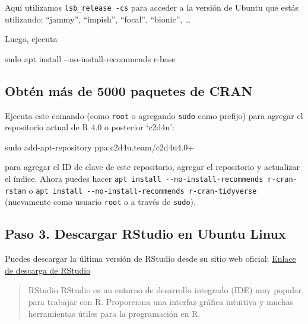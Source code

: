 \documentclass[
  a4paper,
]{article}
\newenvironment{Shaded}{}{}
\newcommand{\AttributeTok}[1]{\textcolor[rgb]{0.84,0.23,0.29}{#1}}
\newcommand{\FunctionTok}[1]{\textcolor[rgb]{0.44,0.26,0.76}{#1}}
\newcommand{\NormalTok}[1]{\textcolor[rgb]{0.14,0.16,0.18}{#1}}
\begin{document}
Aquí utilizamos \texttt{lsb\_release\ -cs} para acceder a la versión de
Ubuntu que estás utilizando: ``jammy'', ``impish'', ``focal'',
``bionic'', \ldots{}

Luego, ejecuta

\begin{Shaded}
\begin{Highlighting}[]
\FunctionTok{sudo}\NormalTok{ apt install }\AttributeTok{{-}{-}no{-}install{-}recommends}\NormalTok{ r{-}base}
\end{Highlighting}
\end{Shaded}

\hypertarget{obtuxe9n-muxe1s-de-5000-paquetes-de-cran}{%
\subsection{Obtén más de 5000 paquetes de
CRAN}\label{obtuxe9n-muxe1s-de-5000-paquetes-de-cran}}

Ejecuta este comando (como \texttt{root} o agregando \texttt{sudo} como
prefijo) para agregar el repositorio actual de R 4.0 o posterior
`c2d4u':

\begin{Shaded}
\begin{Highlighting}[]
\FunctionTok{sudo}\NormalTok{ add{-}apt{-}repository ppa:c2d4u.team/c2d4u4.0+}
\end{Highlighting}
\end{Shaded}

para agregar el ID de clave de este repositorio, agregar el repositorio
y actualizar el índice. Ahora puedes hacer
\texttt{apt\ install\ -\/-no-install-recommends\ r-cran-rstan} o
\texttt{apt\ install\ -\/-no-install-recommends\ r-cran-tidyverse}
(nuevamente como usuario \texttt{root} o a través de \texttt{sudo}).

\hypertarget{paso-3.-descargar-rstudio-en-ubuntu-linux}{%
\subsection{Paso 3. Descargar RStudio en Ubuntu
Linux}\label{paso-3.-descargar-rstudio-en-ubuntu-linux}}

Puedes descargar la última versión de RStudio desde su sitio web
oficial:
\href{https://www.rstudio.com/products/rstudio/download/}{Enlace de
descarga de RStudio}

\begin{quote}
RStudio RStudio es un entorno de desarrollo integrado (IDE) muy popular
para trabajar con R. Proporciona una interfaz gráfica intuitiva y muchas
herramientas útiles para la programación en R.
\end{quote}
\end{document}
